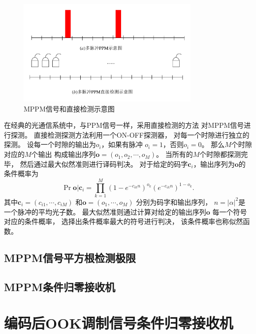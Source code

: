 \begin{figure}
\centering
  \includegraphics[width=0.8\textwidth]{figures/chap4/MPPM-DD}
  \caption{MPPM信号和直接检测示意图}
  \label{fig:MPPM-DD}
\end{figure}

在经典的光通信系统中，与PPM信号一样，采用直接检测的方法
对MPPM信号进行探测\cite{simon2003multi}。
直接检测探测方法利用一个ON-OFF探测器，
对每一个时隙进行独立的探测。
设每一个时隙的输出为$o_i$，如果有脉冲
$o_i=1$，否则$o_i=0$。
那么$M$个时隙对应的$M$个输出
构成输出序列$\bm{o} = (o_1,o_2,\cdots,o_M)$。
当所有的$M$个时隙都探测完毕，
然后通过最大似然准则进行译码判决\cite{simon2003multi}。
对于给定的码字$\bm{c}_i$，输出序列为$\bm{o}$的条件概率为
\begin{equation}
\Pr{\bm{o} | \bm{c}_i} = \prod_{k=1}^M \left(1 - e^{-c_{ik}n} \right)^{o_{k}} \left(e^{-c_{ik}n} \right)^{1-o_{k}} .
\end{equation}
其中$\bm{c}_i=(c_{i1},\cdots,c_{iM})$
和$\bm{o}=(o_{1},\cdots,o_{M})$
分别为码字和输出序列，
$n=|\alpha|^2$是一个脉冲的平均光子数。
最大似然准则通过计算对给定的输出序列$\bm{o}$
每一个符号对应的条件概率，
选择出条件概率最大的符号进行判决，
该条件概率也称似然函数。







\subsection{MPPM信号平方根检测极限}

\subsection{MPPM条件归零接收机}


\section{编码后OOK调制信号条件归零接收机}
